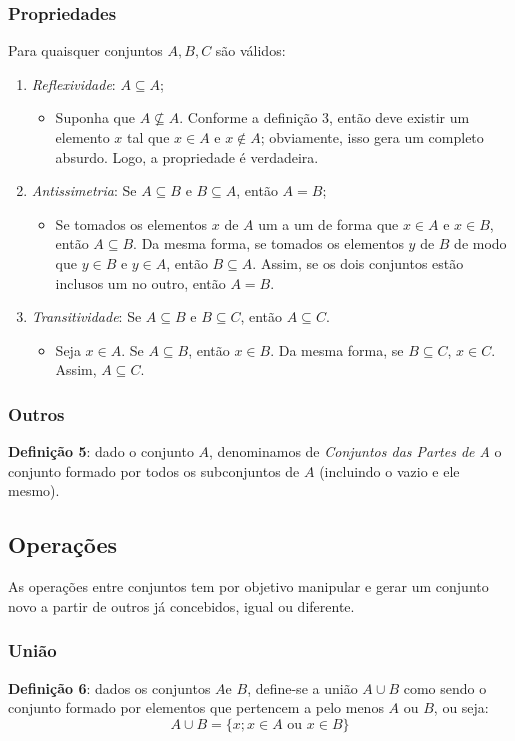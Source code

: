 \documentclass[13pt,letterpaper]{article}
\begin{document}
\subsubsection{Propriedades} 
Para quaisquer conjuntos $A, B, C$ são válidos:
\begin{enumerate}
    \item \emph{Reflexividade}: $A \subseteq A$;
    \begin{itemize}
        \item Suponha que $A \nsubseteq A$. Conforme a definição 3, então deve existir um elemento $x$ tal que $x \in A$ e $x \notin A$; obviamente, isso gera um completo absurdo. Logo, a propriedade é verdadeira.
    \end{itemize}
    \item \emph{Antissimetria}: Se $A \subseteq B$ e $B \subseteq A$, então $A = B$;
    \begin{itemize}
        \item Se tomados os elementos $x$ de $A$ um a um de forma que $x \in A$ e $x \in B$, então $A \subseteq B$. Da mesma forma, se tomados os elementos $y$ de $B$ de modo que $y \in B$ e $y \in A$, então $B \subseteq A$. Assim, se os dois conjuntos estão inclusos um no outro, então $A = B$.
    \end{itemize}
    \item \emph{Transitividade}: Se $A \subseteq B$ e $B \subseteq C$, então $A \subseteq C$.
    \begin{itemize}
        \item Seja $x \in A$. Se $A \subseteq B$, então $x \in B$. Da mesma forma, se $B \subseteq C$, $x \in C$. Assim, $A \subseteq C$.
    \end{itemize}
\end{enumerate}
\subsubsection{Outros}
\textbf{Definição 5}: dado o conjunto $A$, denominamos de \emph{Conjuntos das Partes de A} o conjunto formado por todos os subconjuntos de $A$ (incluindo o vazio e ele mesmo).

\subsection{Operações}
As operações entre conjuntos tem por objetivo manipular e gerar um conjunto novo a partir de outros já concebidos, igual ou diferente.

\subsubsection{União}
\textbf{Definição 6}: dados os conjuntos $A$e $B$, define-se a união $A \cup B$ como sendo o conjunto formado por elementos que pertencem a pelo menos $A$ ou $B$, ou seja:
\begin{displaymath}
    A \cup B = \{ x; x \in A \text{ ou } x \in B \}
\end{displaymath}
\end{document}
